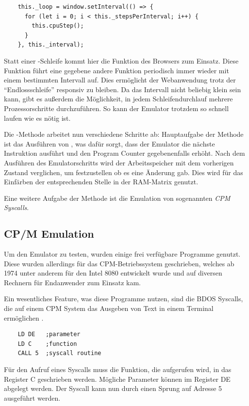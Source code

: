 \begin{verbatim}
    this._loop = window.setInterval(() => {
      for (let i = 0; i < this._stepsPerInterval; i++) {
        this.cpuStep();
      }
    }, this._interval);
\end{verbatim}

Statt einer -Schleife kommt hier die Funktion  des Browsers zum Einsatz. Diese Funktion führt eine gegebene andere Funktion periodisch immer wieder mit einem bestimmten Intervall auf. Dies ermöglicht der Webanwendung trotz der \enquote{Endlossschleife} responsiv zu bleiben. Da das Intervall nicht beliebig klein sein kann, gibt es außerdem die Möglichkeit, in jedem Schleifendurchlauf mehrere Prozessorschritte durchzuführen. So kann der Emulator trotzdem so schnell laufen wie es nötig ist.

Die -Methode arbeitet nun verschiedene Schritte ab: Hauptaufgabe der Methode ist das Ausführen von , was dafür sorgt, dass der Emulator die nächste Instruktion ausführt und den Program Counter gegebenenfalls erhöht. Nach dem Ausführen des Emulatorschritts wird der Arbeitsspeicher mit dem vorherigen Zustand verglichen, um festzustellen ob es eine Änderung gab. Dies wird für das Einfärben der entsprechenden Stelle in der \ac{RAM}-Matrix genutzt.

Eine weitere Aufgabe der Methode ist die Emulation von sogenannten \textit{\ac{CPM} Syscalls}.

\subsection{CP/M Emulation}

Um den Emulator zu testen, wurden einige frei verfügbare Programme genutzt. Diese wurden allerdings für das \ac{CPM}-Betriebssystem geschrieben, welches ab 1974 unter anderem für den Intel 8080 entwickelt wurde und auf diversen Rechnern für Endanwender zum Einsatz kam.

Ein wesentliches Feature, was diese Programme nutzen, sind die \ac{BDOS} Syscalls, die auf einem \ac{CPM} System das Ausgeben von Text in einem Terminal ermöglichen \cite{cpmSyscalls}.

\begin{verbatim}
    LD DE   ;parameter
    LD C    ;function
    CALL 5  ;syscall routine
\end{verbatim}

Für den Aufruf eines Syscalls muss die Funktion, die aufgerufen wird, in das Register C geschrieben werden. Mögliche Parameter können im Register DE abgelegt werden. Der Syscall kann nun durch einen Sprung auf Adresse 5 ausgeführt werden.

